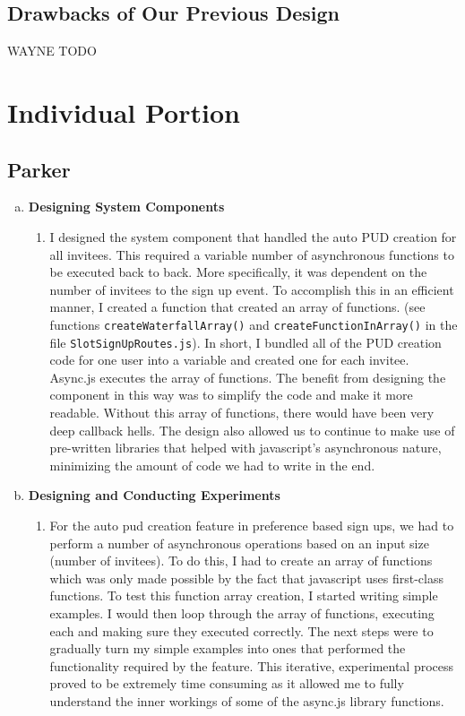 \documentclass[11pt]{article}   %
\begin{document}
\subsection{Drawbacks of Our Previous Design}

{\color{red} WAYNE TODO }

\section{Individual Portion}
\subsection*{Parker}

\begin{enumerate} [a)]
\item {\bf Designing System Components}
\begin{enumerate} [$\cdot$]
\item I designed the system component that handled the auto PUD creation for all invitees. This required a variable number of asynchronous functions to be executed back to back. More specifically, it was dependent on the number of invitees to the sign up event. To accomplish this in an efficient manner, I created a function that created an array of functions. (see functions \texttt{createWaterfallArray()} and \texttt{createFunctionInArray()} in the file \texttt{SlotSignUpRoutes.js}). In short, I bundled all of the PUD creation code for one user into a variable and created one for each invitee. Async.js executes the array of functions. The benefit from designing the component in this way was to simplify the code and make it more readable. Without this array of functions, there would have been very deep callback hells. The design also allowed us to continue to make use of pre-written libraries that helped with javascript's asynchronous nature, minimizing the amount of code we had to write in the end.
\end{enumerate}
\item  {\bf Designing and Conducting Experiments}
\begin{enumerate} [$\cdot$]
\item For the auto pud creation feature in preference based sign ups, we had to perform a number of asynchronous operations based on an input size (number of invitees). To do this, I had to create an array of functions which was only made possible by the fact that javascript uses first-class functions. To test this function array creation, I started writing simple examples. I would then loop through the array of functions, executing each and making sure they executed correctly. The next steps were to gradually turn my simple examples into ones that performed the functionality required by the feature. This iterative, experimental process proved to be extremely time consuming as it allowed me to fully understand the inner workings of some of the async.js library functions.

\end{enumerate}
\end{enumerate}
\end{document}
